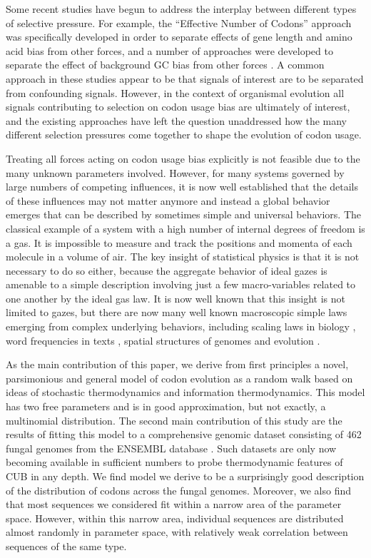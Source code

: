 \documentclass[a4paper,10pt]{paper}%
\begin{document}
\par
Some recent studies have begun to address the interplay between different types of selective pressure. For example, the ``Effective Number of Codons'' approach \cite{2110097} was specifically developed in order to separate effects of gene length and amino acid bias from other forces, and a number of approaches were developed to separate the effect of background GC bias from other forces \cite{7713409,8893856,11729162,12140252}. A common approach in these studies appear to be that signals of interest are to be separated from confounding signals. However, in the context of organismal evolution all signals contributing to selection on codon usage bias are ultimately of interest, and the existing approaches have left the question unaddressed how the many different selection pressures come together to shape the evolution of codon usage. 
\par
Treating all forces acting on codon usage bias explicitly is not  feasible  due to the many unknown parameters involved. However, for many systems governed by large numbers of competing influences, it is now well established that the  details of these influences may not matter anymore and instead a global behavior emerges that can be described by sometimes simple and universal behaviors. The classical example of a   system with a high number of internal degrees of freedom is a gas. It is impossible to measure and track the  positions and momenta of each molecule in a volume of air. The key insight of statistical physics is  that  it is not necessary to do so either, because the aggregate behavior of ideal gazes  is amenable to a simple description involving just  a few macro-variables related to one another by the ideal gas law. It is now well known that this insight is not limited to gazes, but  there are now many well known macroscopic simple laws emerging from complex underlying behaviors, including scaling laws in biology \cite{gwest}, word frequencies in texts \cite{zipf}     , spatial structures of genomes \cite{fantomas21} and evolution \cite{baksneppen,baksneoppen2}.
\par%
As the main contribution of this paper, we derive from first principles  a novel, parsimonious  and general model of codon evolution as a random walk based   on ideas of stochastic thermodynamics and information thermodynamics. This model has two free parameters and  is in good approximation, but not exactly, a multinomial distribution.  The second main contribution of this  study  are the results of fitting  this model to a  comprehensive genomic dataset consisting of 462 fungal genomes from the ENSEMBL database \cite{together}. Such datasets are only now becoming available in sufficient numbers to probe thermodynamic features of CUB in any depth.  We find model we derive to be a surprisingly good  description of the  distribution of codons across the fungal genomes. Moreover, we also find that most  sequences we considered fit within a narrow area of the parameter space.   However, within this narrow area, individual sequences are distributed almost randomly in parameter space, with  relatively weak  correlation between sequences of the same type. 
\end{document}
